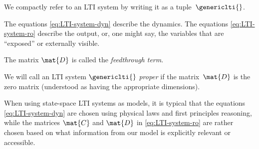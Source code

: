 We compactly refer to an LTI system by writing it as a tuple~$\genericlti{}$.

The equations \cref{eq:LTI-system-dyn} describe the dynamics.
The equations \cref{eq:LTI-system-ro} describe the output, or, one might say, the variables that are ``exposed'' or externally visible.

The matrix $\mat{D}$ is called the \emph{feedthrough term}.

\begin{definition}
    \label{def:prop_LTI_syst}
    We will call an LTI system $\genericlti{}$ \emph{proper} if the matrix~$\mat{D}$ is the zero matrix (understood as having the appropriate dimensions).
\end{definition}

\begin{remark}
    When using state-space LTI systems as models, it is typical that the equations \cref{eq:LTI-system-dyn} are chosen using physical laws and first principles reasoning, while the matrices $\mat{C}$ and $\mat{D}$ in \cref{eq:LTI-system-ro} are rather chosen based on what information from our model is explicitly relevant or accessible.
\end{remark}

